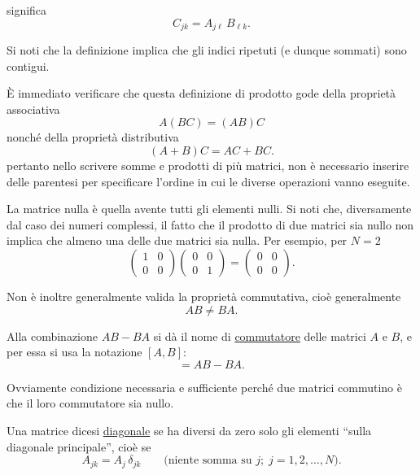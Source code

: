 \documentclass[11pt, a4paper]{book}
\numberwithin{equation}{section}
\begin{document}
significa
\begin{equation}
    C_{jk} = A_{j\ell}\, B_{\ell k}.
    \tag{11b}
\end{equation}

Si noti che la definizione implica che gli indici ripetuti (e dunque sommati) sono contigui.

È immediato verificare che questa definizione di prodotto gode della proprietà associativa
\begin{equation}
    A(BC) = (AB)C
    \tag{12}
\end{equation}
nonché della proprietà distributiva
\begin{equation}
    (A + B)C = AC + BC.
    \tag{12b}
\end{equation}
pertanto nello scrivere somme e prodotti di più matrici, non è necessario inserire delle parentesi per specificare l'ordine in cui le diverse operazioni vanno eseguite.

La matrice nulla è quella avente tutti gli elementi nulli. Si noti che, diversamente dal caso dei numeri complessi, il fatto che il prodotto di due matrici sia nullo non implica che almeno una delle due matrici sia nulla. Per esempio, per $N = 2$
\[
\begin{pmatrix} 1 & 0 \\ 0 & 0 \end{pmatrix}
\begin{pmatrix} 0 & 0 \\ 0 & 1 \end{pmatrix}
=
\begin{pmatrix} 0 & 0 \\ 0 & 0 \end{pmatrix}.
\]

Non è inoltre generalmente valida la proprietà commutativa, cioè generalmente
\begin{equation}
    AB \neq BA.
    \tag{13}
\end{equation}

Alla combinazione $AB - BA$ si dà il nome di \underline{commutatore} delle matrici $A$ e $B$, e per essa si usa la notazione $[A, B]$:
\begin{equation}
    [A, B] = AB - BA.
    \tag{14}
\end{equation}

Ovviamente condizione necessaria e sufficiente perché due matrici commutino è che il loro commutatore sia nullo.

Una matrice dicesi \underline{diagonale} se ha diversi da zero solo gli elementi ``sulla diagonale principale'', cioè se
\begin{equation}
    A_{jk} = A_j\, \delta_{jk} \qquad \text{(niente somma su } j;\; j = 1, 2, \ldots, N\text{)}.
    \tag{15}
\end{equation}
\end{document}
